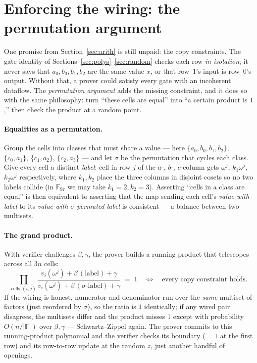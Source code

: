 \documentclass[11pt,a4paper]{article}
\theoremstyle{definition}
\newcommand{\F}{\mathbb{F}}
\begin{document}
\section{Enforcing the wiring: the permutation argument}\label{sec:perm}

One promise from Section~\ref{sec:arith} is still unpaid: the copy constraints.
The gate identity of Sections~\ref{sec:polys}--\ref{sec:random} checks each row
\emph{in isolation}; it never says that $a_0, b_0, b_1, b_2$ are the same value
$x$, or that row~$1$'s input is row~$0$'s output. Without that, a prover could
satisfy every gate with an incoherent dataflow. The \emph{permutation argument}
adds the missing constraint, and it does so with the same philosophy: turn
``these cells are equal'' into ``a certain product is $1$,'' then check the
product at a random point.

\paragraph{Equalities as a permutation.} Group the cells into classes that must
share a value --- here $\{a_0, b_0, b_1, b_2\}$, $\{c_0, a_1\}$,
$\{c_1, a_2\}$, $\{c_2, a_3\}$ --- and let $\sigma$ be the permutation that
cycles each class. Give every cell a distinct \emph{label}: cell in row $j$ of
the $a$-, $b$-, $c$-column gets $\omega^j$, $k_1\omega^j$, $k_2\omega^j$
respectively, where $k_1, k_2$ place the three columns in disjoint cosets so no
two labels collide (in $\F_{97}$ we may take $k_1 = 2, k_2 = 3$). Asserting
``cells in a class are equal'' is then equivalent to asserting that the map
sending each cell's \emph{value-with-label} to its \emph{value-with-$\sigma$-permuted-label}
is consistent --- a balance between two multisets.

\paragraph{The grand product.} With verifier challenges $\beta, \gamma$, the
prover builds a running product that telescopes across all $3n$ cells:
\[
\prod_{\text{cells } (i,j)}
\frac{v_{i}(\omega^j) + \beta\,(\text{label}) + \gamma}
     {v_{i}(\omega^j) + \beta\,(\text{$\sigma$-label}) + \gamma}
\;=\; 1
\quad\Longleftrightarrow\quad
\text{every copy constraint holds.}
\]
If the wiring is honest, numerator and denominator run over the \emph{same}
multiset of factors (just reordered by $\sigma$), so the ratio is $1$ identically;
if any wired pair disagrees, the multisets differ and the product misses $1$
except with probability $O(n/|\F|)$ over $\beta, \gamma$ --- Schwartz--Zippel
again. The prover commits to this running-product polynomial and the verifier
checks its boundary ($=1$ at the first row) and its row-to-row update at the
random $z$, just another handful of openings.
\end{document}

